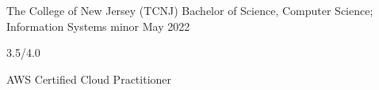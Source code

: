 
\begin{cventry}
    {The College of New Jersey (TCNJ)}
    {Bachelor of Science, Computer Science; Information Systems minor}
    {May 2022}{}{}
    \begin{cvitems}
        \item{} 3.5/4.0
        \item{} AWS Certified Cloud Practitioner 
    \end{cvitems}
\end{cventry}
